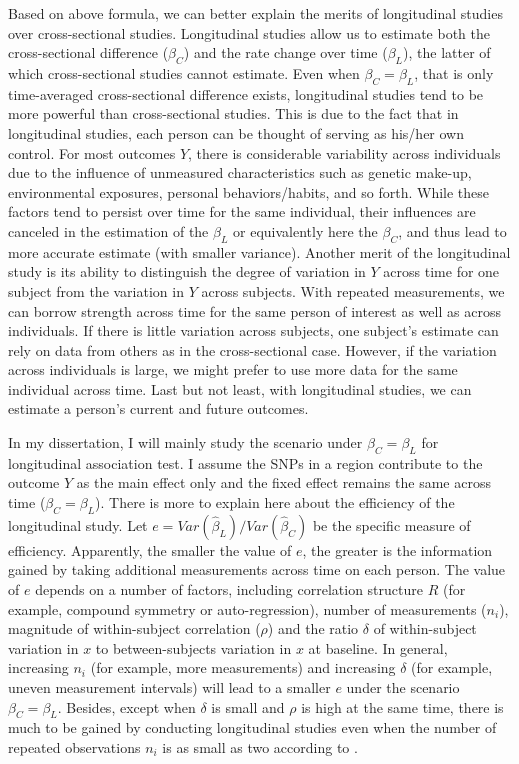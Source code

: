 \documentclass[12pt]{article}
\begin{document}
Based on above formula, we can better explain the merits of longitudinal studies over cross-sectional studies. 
Longitudinal studies allow us to estimate both the cross-sectional difference ($\beta_C$) and the rate change over time ($\beta_L$), the latter of which cross-sectional studies cannot estimate.
Even when $\beta_C = \beta_L$, that is only time-averaged cross-sectional difference exists, longitudinal studies tend to be more powerful than cross-sectional studies. This is due to the fact that in longitudinal studies, each person can be thought of serving as his/her own control. For most outcomes $Y$, there is considerable variability across individuals due to the influence of unmeasured characteristics such as genetic make-up, environmental exposures, personal behaviors/habits, and so forth. While these factors tend to persist over time for the same individual, their influences are canceled in the estimation of the $\beta_L$ or equivalently here the $\beta_C$, and thus lead to more accurate estimate (with smaller variance).
Another merit of the longitudinal study is its ability to distinguish the degree of variation in $Y$ across time for one subject from the variation in $Y$ across subjects. With repeated measurements, we can borrow strength across time for the same person of interest as well as across individuals. If there is little variation across subjects, one subject's estimate can rely on data from others as in the cross-sectional case. However, if the variation across individuals is large, we might prefer to use more data for the same individual across time.
Last but not least, with longitudinal studies, we can estimate a person's current and future outcomes.

In my dissertation, I will mainly study the scenario under $\beta_C = \beta_L$ for longitudinal association test. I assume the SNPs in a region contribute to the outcome $Y$ as the main effect only and the fixed effect remains the same across time ($\beta_C = \beta_L$). There is more to explain here about the efficiency of the longitudinal study. Let $e = Var(\hat{\beta}_L) / Var(\hat{\beta}_C)$ be the specific measure of efficiency. Apparently, the smaller the value of $e$, the greater is the information gained by taking additional measurements across time on each person. The value of $e$ depends on a number of factors, including correlation structure $R$ (for example, compound symmetry or auto-regression), number of measurements ($n_i$), magnitude of within-subject correlation ($\rho$) and the ratio $\delta$ of within-subject variation in $x$ to between-subjects variation in $x$ at baseline. In general, increasing $n_i$ (for example, more measurements) and increasing $\delta$ (for example, uneven measurement intervals) will lead to a smaller $e$ under the scenario $\beta_C = \beta_L$. Besides, except when $\delta$ is small and $\rho$ is high at the same time, there is much to be gained by conducting longitudinal studies even when the number of repeated observations $n_i$ is as small as two according to \cite{Diggle2002}. 
\end{document}
